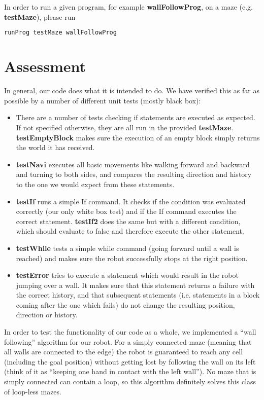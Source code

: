 \documentclass[a4paper]{article}
\begin{document}
In order to run a given program, for example \textbf{wallFollowProg}, on a maze (e.g. \textbf{testMaze}), please run
\begin{lstlisting}[language=haskell]
  runProg testMaze wallFollowProg
\end{lstlisting} 

\section{Assessment}


In general, our code does what it is intended to do. We have verified this as far as possible by a number of different unit tests (mostly black box):
\begin{itemize}
  \item There are a number of tests checking if statements are executed as expected. If not specified otherwise, they are all run in the provided \textbf{testMaze}. \textbf{testEmptyBlock} makes sure the execution of an empty block simply returns the world it has received.
  \item \textbf{testNavi} executes all basic movements like walking forward and backward and turning to both sides, and compares the resulting direction and history to the one we would expect from these statements.
  \item \textbf{testIf} runs a simple If command. It checks if the condition was evaluated correctly (our only white box test) and if the If command executes the correct statement. \textbf{testIf2} does the same but with a different condition, which should evaluate to false and therefore execute the other statement.
  \item \textbf{testWhile} tests a simple while command (going forward until a wall is reached) and makes sure the robot successfully stops at the right position.
  \item \textbf{testError} tries to execute a statement which would result in the robot jumping over a wall. It makes sure that this statement returns a failure with the correct history, and that subsequent statements (i.e. statements in a block coming after the one which fails) do not change the resulting position, direction or history.
\end{itemize}

In order to test the functionality of our code as a whole, we implemented a ``wall following'' algorithm for our robot.
For a simply connected maze (meaning that all walls are
connected to the edge) the robot is guaranteed to reach any cell (including the goal position) without getting lost by following the wall on its left (think of it as ``keeping one hand in contact with the left wall''). No maze
that is simply connected can contain a loop, so this algorithm
definitely solves this class of loop-less mazes. 
\end{document}
